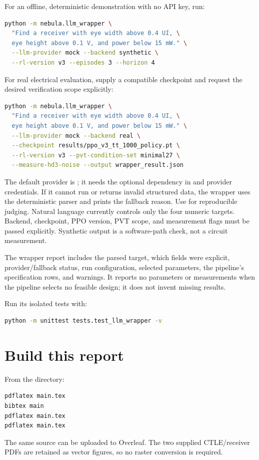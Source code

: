 For an offline, deterministic demonstration with no API key, run:

\begin{lstlisting}[language=bash]
python -m nebula.llm_wrapper \
  "Find a receiver with eye width above 0.4 UI, \
  eye height above 0.1 V, and power below 15 mW." \
  --llm-provider mock --backend synthetic \
  --rl-version v3 --episodes 3 --horizon 4
\end{lstlisting}

For real electrical evaluation, supply a compatible checkpoint and request the
desired verification scope explicitly:

\begin{lstlisting}[language=bash]
python -m nebula.llm_wrapper \
  "Find a receiver with eye width above 0.4 UI, \
  eye height above 0.1 V, and power below 15 mW." \
  --llm-provider mock --backend real \
  --checkpoint results/ppo_v3_tt_1000_policy.pt \
  --rl-version v3 --pvt-condition-set minimal27 \
  --measure-hd3-noise --output wrapper_result.json
\end{lstlisting}

The default provider is ; it needs the optional dependency in
 and provider
credentials. If it cannot run or returns invalid structured data, the wrapper
uses the deterministic parser and prints the fallback reason. Use
\code{--llm-provider mock} for reproducible judging. Natural language currently
controls only the four numeric targets. Backend, checkpoint, PPO version, PVT
scope, and measurement flags must be passed explicitly. Synthetic output is a
software-path check, not a circuit measurement.

The wrapper report includes the parsed target, which fields were explicit,
provider/fallback status, run configuration, selected parameters, the pipeline's
specification rows, and warnings. It reports no parameters or measurements when
the pipeline selects no feasible design; it does not invent missing results.

Run its isolated tests with:

\begin{lstlisting}[language=bash]
python -m unittest tests.test_llm_wrapper -v
\end{lstlisting}

\section{Build this report}

From the \code{report/} directory:
\begin{lstlisting}[language=bash]
pdflatex main.tex
bibtex main
pdflatex main.tex
pdflatex main.tex
\end{lstlisting}
The same source can be uploaded to Overleaf. The two supplied CTLE/receiver PDFs
are retained as vector figures, so no raster conversion is required.
